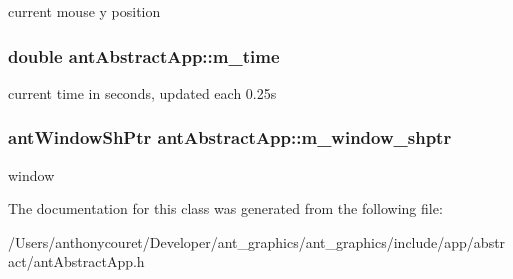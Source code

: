 current mouse y position \hypertarget{classant_abstract_app_a477dd78269fac0a6c2b20aa7fac41426}{
\subsubsection[{m\+\_\+time}]{\setlength{\rightskip}{0pt plus 5cm}double ant\+Abstract\+App\+::m\+\_\+time\hspace{0.3cm}{\ttfamily [protected]}}}\label{classant_abstract_app_a477dd78269fac0a6c2b20aa7fac41426}
current time in seconds, updated each 0.\+25s \hypertarget{classant_abstract_app_a2da8dc7071eb8f76ffe3fae6329439b2}{
\subsubsection[{m\+\_\+window\+\_\+shptr}]{\setlength{\rightskip}{0pt plus 5cm}ant\+Window\+Sh\+Ptr ant\+Abstract\+App\+::m\+\_\+window\+\_\+shptr\hspace{0.3cm}{\ttfamily [protected]}}}\label{classant_abstract_app_a2da8dc7071eb8f76ffe3fae6329439b2}
window 

The documentation for this class was generated from the following file\+:\begin{DoxyCompactItemize}
\item 
/\+Users/anthonycouret/\+Developer/ant\+\_\+graphics/ant\+\_\+graphics/include/app/abstract/ant\+Abstract\+App.\+h\end{DoxyCompactItemize}
